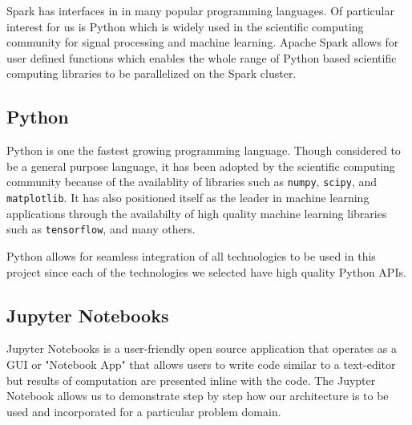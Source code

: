 \documentclass[conference,twoside]{IEEEtran}
\newcommand{\code}[1]{\texttt{#1}}
\begin{document}
Spark has interfaces in in many popular programming languages. Of particular interest for us is Python which is widely used in the scientific computing community for signal processing and machine learning. Apache Spark allows for user defined functions which enables the whole range of Python based scientific computing libraries to be parallelized on the Spark cluster\cite{spark}.


\subsection{Python}
Python is one the fastest growing programming language\cite{python}. Though considered to be a general purpose language, it has been adopted by the scientific computing community because of the availablity of libraries such as \code{numpy}, \code{scipy}, and \code{matplotlib}. It has also positioned itself as the leader in machine learning applications through the availabilty of high quality machine learning libraries such as \code{tensorflow}, and many others.

Python allows for seamless integration of all technologies to be used in this project since each of the technologies we selected have high quality Python APIs.

\subsection{Jupyter Notebooks}
Jupyter Notebooks is a user-friendly open source application that operates as a GUI or "Notebook App" that allows users to write code similar to a text-editor but results of computation are presented inline with the code\cite{jupyter}. The Juypter Notebook allows us to demonstrate step by step how our architecture is to be used and incorporated for a particular problem domain.
\end{document}

